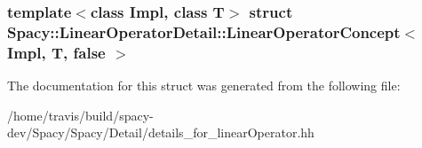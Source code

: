 \subsubsection*{template$<$class Impl, class T$>$ struct Spacy\-::\-Linear\-Operator\-Detail\-::\-Linear\-Operator\-Concept$<$ Impl, T, false $>$}



\-The documentation for this struct was generated from the following file\-:\begin{DoxyCompactItemize}
\item 
/home/travis/build/spacy-\/dev/\-Spacy/\-Spacy/\-Detail/details\-\_\-for\-\_\-linear\-Operator.\-hh\end{DoxyCompactItemize}

